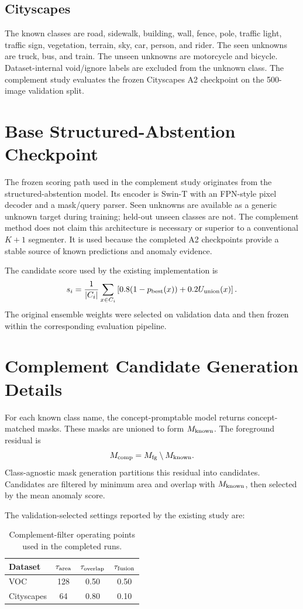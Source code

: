 \documentclass[11pt]{article}
\begin{document}
\subsection{Cityscapes}
The known classes are road, sidewalk, building, wall, fence, pole, traffic light, traffic sign, vegetation, terrain, sky, car, person, and rider. The seen unknowns are truck, bus, and train. The unseen unknowns are motorcycle and bicycle. Dataset-internal void/ignore labels are excluded from the unknown class. The complement study evaluates the frozen Cityscapes A2 checkpoint on the 500-image validation split.

\section{Base Structured-Abstention Checkpoint}
The frozen scoring path used in the complement study originates from the structured-abstention model. Its encoder is Swin-T with an FPN-style pixel decoder and a mask/query parser. Seen unknowns are available as a generic unknown target during training; held-out unseen classes are not. The complement method does not claim this architecture is necessary or superior to a conventional $K+1$ segmenter. It is used because the completed A2 checkpoints provide a stable source of known predictions and anomaly evidence.

The candidate score used by the existing implementation is
\begin{equation}
 s_i=\frac{1}{|C_i|}\sum_{x\in C_i}\left[0.8(1-p_{\rm best}(x))+0.2U_{\rm union}(x)\right].
\end{equation}
The original ensemble weights were selected on validation data and then frozen within the corresponding evaluation pipeline.

\section{Complement Candidate Generation Details}
For each known class name, the concept-promptable model returns concept-matched masks. These masks are unioned to form $M_{\rm known}$. The foreground residual is
\begin{equation}
M_{\rm comp}=M_{\rm fg}\setminus M_{\rm known}.
\end{equation}
Class-agnostic mask generation partitions this residual into candidates. Candidates are filtered by minimum area and overlap with $M_{\rm known}$, then selected by the mean anomaly score.

The validation-selected settings reported by the existing study are:
\begin{table}[h]
\centering
\caption{Complement-filter operating points used in the completed runs.}
\begin{tabular}{lccc}
\toprule
Dataset & $\tau_{\rm area}$ & $\tau_{\rm overlap}$ & $\tau_{\rm fusion}$ \\
\midrule
VOC & 128 & 0.50 & 0.50 \\
Cityscapes & 64 & 0.80 & 0.10 \\
\bottomrule
\end{tabular}
\end{table}
\end{document}
